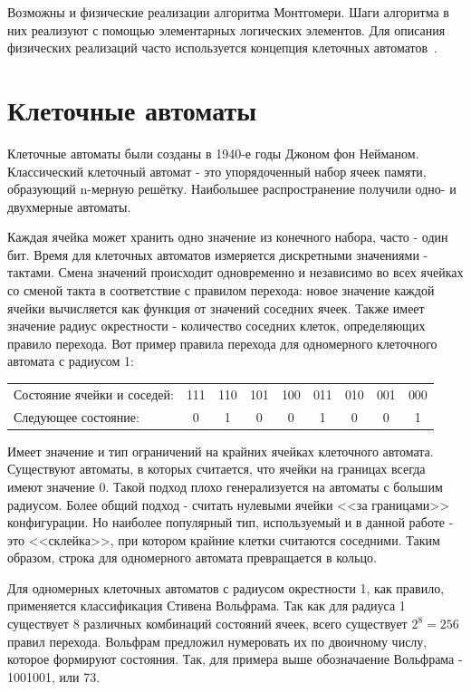 \documentclass[times,specification,annotation]{itmo-student-thesis}
\begin{document}
Возможны и физические реализации алгоритма Монтгомери.
Шаги алгоритма в них реализуют с помощью элементарных логических элементов.
Для описания физических реализаций часто используется концепция клеточных автоматов~\cite{jeo07, ku04}.

\section{Клеточные автоматы}\label{sec:cells}

Клеточные автоматы были созданы в 1940-е годы Джоном фон Нейманом.
Классический клеточный автомат - это упорядоченный набор ячеек памяти, образующий n-мерную решётку.
Наибольшее распространение получили одно- и двухмерные автоматы.

Каждая ячейка может хранить одно значение из конечного набора, часто - один бит.
Время для клеточных автоматов измеряется дискретными значениями - тактами.
Смена значений происходит одновременно и независимо во всех ячейках со сменой такта в соответствие с правилом перехода:
новое значение каждой ячейки вычисляется как функция от значений соседних ячеек.
Также имеет значение радиус окрестности - количество соседних клеток, определяющих правило перехода.
Вот пример правила перехода для одномерного клеточного автомата с радиусом 1:
\begin{table}[h]
\begin{tabular}{ l l l l l l l l l }
Состояние ячейки и соседей: & 111 & 110 & 101 & 100 & 011 & 010 & 001 & 000 \\
Следующее состояние: & ~0 & ~1 & ~0 & ~0 & ~1 & ~0 & ~0 & ~1 \\
\end{tabular}
\end{table}

Имеет значение и тип ограничений на крайних ячейках клеточного автомата.
Существуют автоматы, в которых считается, что ячейки на границах всегда имеют значение 0.
Такой подход плохо генерализуется на автоматы с большим радиусом.
Более общий подход - считать нулевыми ячейки <<за границами>> конфигурации.
Но наиболее популярный тип, используемый и в данной работе - это <<склейка>>, при котором крайние клетки считаются соседними.
Таким образом, строка для одномерного автомата превращается в кольцо.

Для одномерных клеточных автоматов с радиусом окрестности 1, как правило, применяется классификация Стивена Вольфрама.
Так как для радиуса 1 существует 8 различных комбинаций состояний ячеек, всего существует $2^8=256$ правил перехода.
Вольфрам предложил нумеровать их по двоичному числу, которое формируют состояния.
Так, для примера выше обозначаение Вольфрама - 1001001, или 73.
\end{document}
